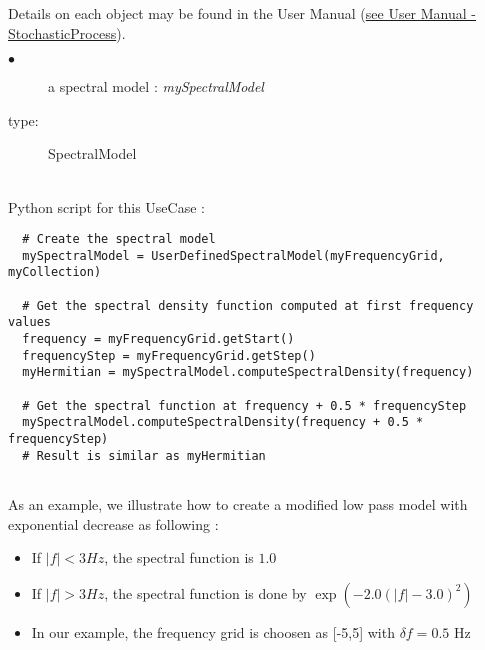 Details on each object may be found in the User Manual  (\href{OpenTURNS_UserManual_TUI.pdf}{see User Manual - StochasticProcess}).\\


{
  \begin{description}
  \item[$\bullet$] a spectral model : {\itshape mySpectralModel }
  \item[type:] SpectralModel
  \end{description}

}

\textspace\\
Python script for this UseCase :

\begin{lstlisting}
  # Create the spectral model
  mySpectralModel = UserDefinedSpectralModel(myFrequencyGrid, myCollection)

  # Get the spectral density function computed at first frequency values
  frequency = myFrequencyGrid.getStart()
  frequencyStep = myFrequencyGrid.getStep()
  myHermitian = mySpectralModel.computeSpectralDensity(frequency)

  # Get the spectral function at frequency + 0.5 * frequencyStep
  mySpectralModel.computeSpectralDensity(frequency + 0.5 * frequencyStep)
  # Result is similar as myHermitian
 
\end{lstlisting}



As an example, we illustrate how to create a modified low pass model with exponential decrease as following :
\begin{itemize}
\item If $|f| < 3 Hz$, the spectral function is $1.0$
\item If $|f| > 3 Hz$, the spectral function is done by $\exp \left(- 2.0 (|f| - 3.0)^2 \right)$
\item In our example, the frequency grid is choosen as [-5,5] with $\delta f = 0.5$ Hz
\end{itemize}


